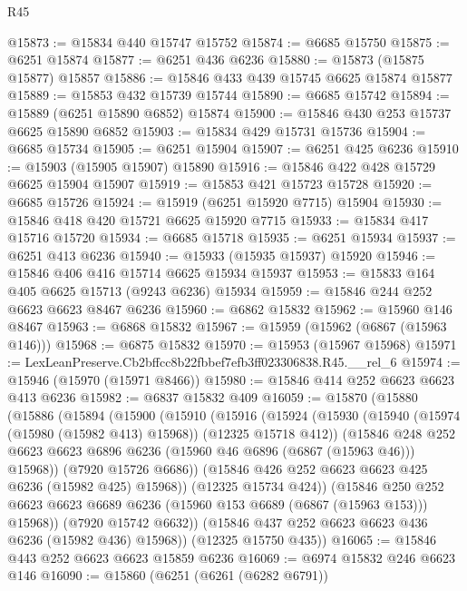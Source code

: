 \begin{lexlean}{R45}
\begin{coremodule}
{@15873 := @15834 @440 @15747 @15752
@15874 := @6685 @15750
@15875 := @6251 @15874
@15877 := @6251 @436 @6236
@15880 := @15873 (@15875 @15877) @15857
@15886 := @15846 @433 @439 @15745 @6625 @15874 @15877
@15889 := @15853 @432 @15739 @15744
@15890 := @6685 @15742
@15894 := @15889 (@6251 @15890 @6852) @15874
@15900 := @15846 @430 @253 @15737 @6625 @15890 @6852
@15903 := @15834 @429 @15731 @15736
@15904 := @6685 @15734
@15905 := @6251 @15904
@15907 := @6251 @425 @6236
@15910 := @15903 (@15905 @15907) @15890
@15916 := @15846 @422 @428 @15729 @6625 @15904 @15907
@15919 := @15853 @421 @15723 @15728
@15920 := @6685 @15726
@15924 := @15919 (@6251 @15920 @7715) @15904
@15930 := @15846 @418 @420 @15721 @6625 @15920 @7715
@15933 := @15834 @417 @15716 @15720
@15934 := @6685 @15718
@15935 := @6251 @15934
@15937 := @6251 @413 @6236
@15940 := @15933 (@15935 @15937) @15920
@15946 := @15846 @406 @416 @15714 @6625 @15934 @15937
@15953 := @15833 @164 @405 @6625 @15713 (@9243 @6236) @15934
@15959 := @15846 @244 @252 @6623 @6623 @8467 @6236
@15960 := @6862 @15832
@15962 := @15960 @146 @8467
@15963 := @6868 @15832
@15967 := @15959 (@15962 (@6867 (@15963 @146)))
@15968 := @6875 @15832
@15970 := @15953 (@15967 @15968)
@15971 := LexLeanPreserve.Cb2bffcc8b22fbbef7efb3ff023306838.R45.__rel_6
@15974 := @15946 (@15970 (@15971 @8466))
@15980 := @15846 @414 @252 @6623 @6623 @413 @6236
@15982 := @6837 @15832 @409
@16059 := @15870
    (@15880
      (@15886
        (@15894
          (@15900
            (@15910
              (@15916
                (@15924
                  (@15930
                    (@15940 (@15974 (@15980 (@15982 @413) @15968)) (@12325 @15718 @412))
                    (@15846
                      @248
                      @252
                      @6623
                      @6623
                      @6896
                      @6236
                      (@15960 @46 @6896 (@6867 (@15963 @46)))
                      @15968))
                  (@7920 @15726 @6686))
                (@15846 @426 @252 @6623 @6623 @425 @6236 (@15982 @425) @15968))
              (@12325 @15734 @424))
            (@15846
              @250
              @252
              @6623
              @6623
              @6689
              @6236
              (@15960 @153 @6689 (@6867 (@15963 @153)))
              @15968))
          (@7920 @15742 @6632))
        (@15846 @437 @252 @6623 @6623 @436 @6236 (@15982 @436) @15968))
      (@12325 @15750 @435))
@16065 := @15846 @443 @252 @6623 @6623 @15859 @6236
@16069 := @6974 @15832 @246 @6623 @146
@16090 := @15860
    (@6251
      (@6261 (@6282 @6791))
}
\end{coremodule}
\end{lexlean}
